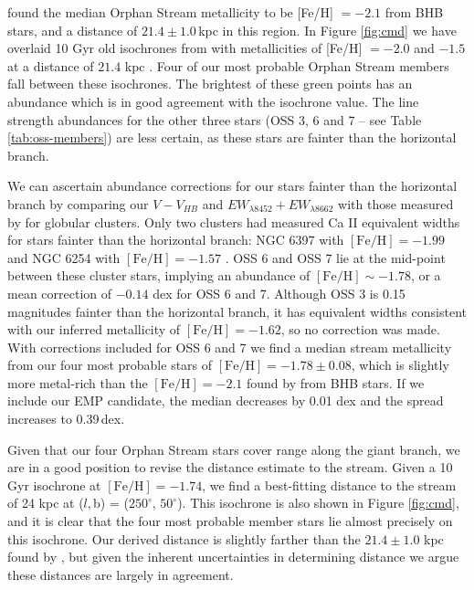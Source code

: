 \documentclass{emulateapj}
\begin{document}
\citet{Newberg;et-al_2010} found the median Orphan Stream metallicity to be [Fe/H] $= -2.1$ from BHB stars, and a distance of $21.4 \pm 1.0$\,kpc in this region. In Figure \ref{fig:cmd} we have overlaid 10 Gyr old isochrones from \citet{Girardi;et-al_2008} with metallicities of [Fe/H] $= -2.0$ and $-1.5$ at a distance of $21.4$ kpc \citep{Newberg;et-al_2010}. Four of our most probable Orphan Stream members fall between these isochrones. The brightest of these green points has an abundance which is in good agreement with the isochrone value. The line strength abundances for the other three stars (OSS 3, 6 and 7 \--- see Table \ref{tab:oss-members}) are less certain, as these stars are fainter than the horizontal branch. 

We can ascertain abundance corrections for our stars fainter than the horizontal branch by comparing our $V-V_{HB}$ and $EW_{\lambda8452} + EW_{\lambda8662}$ with those measured by \citet{Saviane;et-al_2012} for globular clusters. Only two clusters had measured Ca \textsc{II} equivalent widths for stars fainter than the horizontal branch: NGC 6397 with $[\mbox{Fe/H}] = -1.99$ and NGC 6254 with $[\mbox{Fe/H}] = -1.57$ \citep[both abundances from][]{Carretta;et-al_2009}. OSS 6 and OSS 7 lie at the mid-point between these cluster stars, implying an abundance of $[\mbox{Fe/H}] \sim -1.78$, or a mean correction of $-0.14$ dex for OSS 6 and 7. Although OSS 3 is 0.15 magnitudes fainter than the horizontal branch, it has equivalent widths consistent with our inferred metallicity of $[\mbox{Fe/H}] = -1.62$, so no correction was made. With corrections included for OSS 6 and 7 we find a median stream metallicity from our four most probable stars of $[\mbox{Fe/H}] = -1.78 \pm 0.08$, which is slightly more metal-rich than the $[\mbox{Fe/H}] =-2.1$ found by \citet{Newberg;et-al_2010} from BHB stars. If we include our EMP candidate, the median decreases by 0.01 dex and the spread increases to 0.39\,dex. 

Given that our four Orphan Stream stars cover range along the giant branch, we are in a good position to revise the distance estimate to the stream. Given a 10 Gyr \citet{Girardi;et-al_2008} isochrone at $[\mbox{Fe/H}] = -1.74$, we find a best-fitting distance to the stream of 24 kpc at ($l, $b) = ($250^\circ$, $50^\circ$). This isochrone is also shown in Figure \ref{fig:cmd}, and it is clear that the four most probable member stars lie almost precisely on this isochrone. Our derived distance is slightly farther than the $21.4 \pm 1.0$ kpc found by \citet{Newberg;et-al_2010}, but given the inherent uncertainties in determining distance we argue these distances are largely in agreement.
\end{document}
